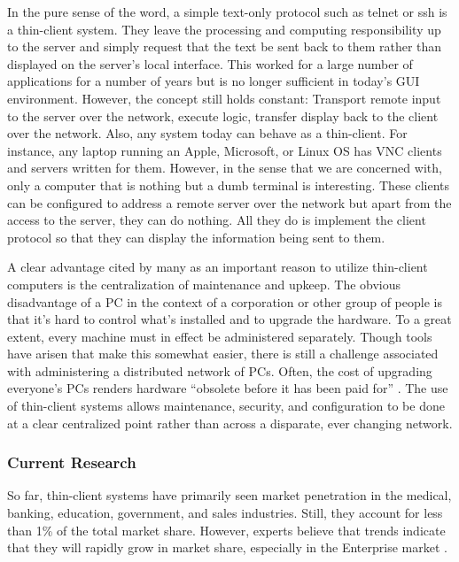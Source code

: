 \documentclass[12pt,oneside,letterpaper]{article}
\begin{document}
In the pure sense of the word, a simple text-only protocol such as telnet or ssh
is a thin-client system.  They leave the processing and computing responsibility
up to the server and simply request that the text be sent back to them rather
than displayed on the server's local interface.  This worked for a large number
of applications for a number of years but is no longer sufficient in today's GUI
environment.  However, the concept still holds constant: Transport remote input
to the server over the network, execute logic, transfer display back to the
client over the network.  Also, any system today can behave as a thin-client.
For instance, any laptop running an Apple, Microsoft, or Linux OS has VNC
clients and servers written for them.  However, in the sense that we are
concerned with, only a computer that is nothing but a dumb terminal is
interesting.  These clients can be configured to address a remote server over
the network but apart from the access to the server, they can do nothing.  All
they do is implement the client protocol so that they can display the
information being sent to them.

A clear advantage cited by many as an important reason to utilize thin-client
computers is the centralization of maintenance and upkeep.  The obvious
disadvantage of a PC in the context of a corporation or other group of people is
that it's hard to control what's installed and to upgrade the hardware.  To a
great extent, every machine must in effect be administered separately.  Though
tools have arisen that make this somewhat easier, there is still a challenge
associated with administering a distributed network of PCs.  Often, the cost of
upgrading everyone's PCs renders hardware ``obsolete before it has been paid
for'' \citep{schmidt1999}.  The use of thin-client systems allows maintenance,
security, and configuration to be done at a clear centralized point rather than
across a disparate, ever changing network.

\subsubsection{Current Research}

So far, thin-client systems have primarily seen market penetration in the
medical, banking, education, government, and sales industries. Still, they
account for less than 1\% of the total market share.  However, experts believe
that trends indicate that they will rapidly grow in market share, especially in
the Enterprise market \citep{tynan2005}.
\end{document}
